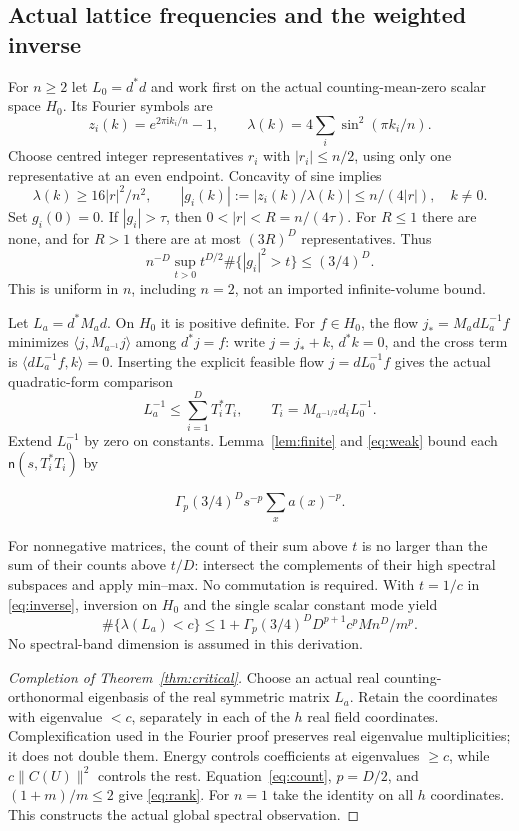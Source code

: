 \documentclass[11pt]{article}
\newcommand{\nct}{\mathsf n}
\begin{document}
\subsection{Actual lattice frequencies and the weighted inverse}
For $n\geq2$ let $L_0=d^*d$ and work first on the actual counting-mean-zero scalar
space $H_0$. Its Fourier symbols are
\[
 z_i(k)=e^{2\pi\mathrm i k_i/n}-1,\qquad
 \lambda(k)=4\sum_i\sin^2(\pi k_i/n).
\]
Choose centred integer representatives $r_i$ with $|r_i|\leq n/2$, using only one
representative at an even endpoint. Concavity of sine implies
\[
 \lambda(k)\geq16|r|^2/n^2,\qquad
 |g_i(k)|:=|z_i(k)/\lambda(k)|\leq n/(4|r|),\quad k\ne0.
\]
Set $g_i(0)=0$. If $|g_i|>\tau$, then $0<|r|<R=n/(4\tau)$.
For $R\leq1$ there are none, and for $R>1$ there are at most $(3R)^D$ representatives.
Thus
\begin{equation}\label{eq:weak}
 n^{-D}\sup_{t>0}t^{D/2}\#\{|g_i|^2>t\}\leq(3/4)^D.
\end{equation}
This is uniform in $n$, including $n=2$, not an imported infinite-volume bound.

Let $L_a=d^*M_ad$. On $H_0$ it is positive definite. For $f\in H_0$, the flow
$j_*=M_adL_a^{-1}f$ minimizes $\langle j,M_{a^{-1}}j\rangle$ among $d^*j=f$:
write $j=j_*+k$, $d^*k=0$, and the cross term is
$\langle dL_a^{-1}f,k\rangle=0$. Inserting the explicit feasible flow
$j=dL_0^{-1}f$ gives the actual quadratic-form comparison
\begin{equation}\label{eq:inverse}
 L_a^{-1}\leq\sum_{i=1}^DT_i^*T_i,\qquad
 T_i=M_{a^{-1/2}}d_iL_0^{-1}.
\end{equation}
Extend $L_0^{-1}$ by zero on constants. Lemma~\ref{lem:finite} and \eqref{eq:weak}
bound each $\nct(s,T_i^*T_i)$ by

\[
 \Gamma_p(3/4)^Ds^{-p}\sum_xa(x)^{-p}.
\]

For nonnegative matrices, the count of their sum above $t$ is no larger than the
sum of their counts above $t/D$: intersect the complements of their high spectral
subspaces and apply min--max. No commutation is required. With $t=1/c$ in
\eqref{eq:inverse}, inversion on $H_0$ and the single scalar constant mode yield
\begin{equation}\label{eq:count}
 \#\{\lambda(L_a)<c\}\leq
 1+\Gamma_p(3/4)^DD^{p+1}c^pM n^D/m^p.
\end{equation}
No spectral-band dimension is assumed in this derivation.

\begin{proof}[Completion of Theorem~\ref{thm:critical}]
Choose an actual real counting-orthonormal eigenbasis of the real symmetric matrix
$L_a$. Retain the coordinates with eigenvalue $<c$, separately in each of the $h$
real field coordinates. Complexification used in the Fourier proof preserves real
eigenvalue multiplicities; it does not double them. Energy controls coefficients at
eigenvalues $\geq c$, while $c\|C(U)\|^2$ controls the rest. Equation~\eqref{eq:count},
$p=D/2$, and $(1+m)/m\leq2$ give \eqref{eq:rank}. For $n=1$ take the identity on all
$h$ coordinates. This constructs the actual global spectral observation.
\end{proof}
\end{document}
